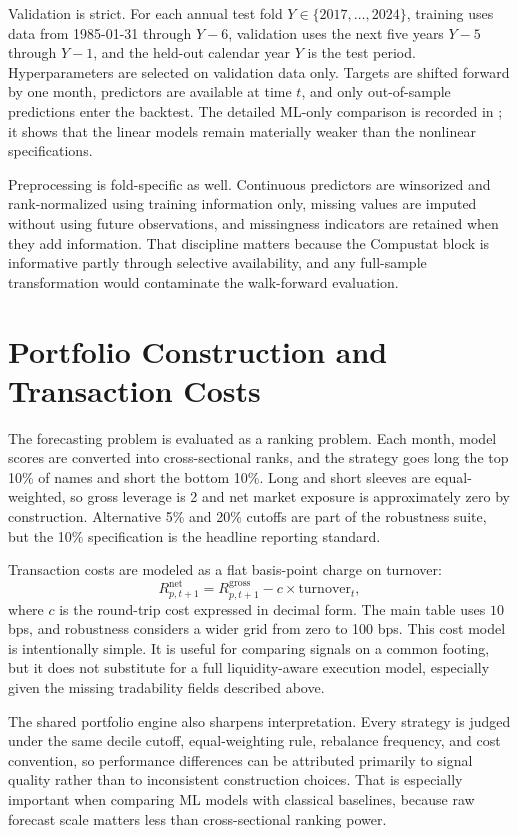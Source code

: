 Validation is strict. For each annual test fold $Y \in \{2017,\ldots,2024\}$,
training uses data from 1985-01-31 through $Y-6$, validation uses the next
five years $Y-5$ through $Y-1$, and the held-out calendar year $Y$ is the
test period. Hyperparameters are selected on validation data only. Targets are
shifted forward by one month, predictors are available at time $t$, and only
out-of-sample predictions enter the backtest. The detailed ML-only
comparison is recorded in ; it
shows that the linear models remain materially weaker than the nonlinear
specifications.

Preprocessing is fold-specific as well. Continuous predictors are winsorized
and rank-normalized using training information only, missing values are
imputed without using future observations, and missingness indicators are
retained when they add information. That discipline matters because the
Compustat block is informative partly through selective availability, and any
full-sample transformation would contaminate the walk-forward evaluation.

\section{Portfolio Construction and Transaction Costs}

The forecasting problem is evaluated as a ranking problem. Each month, model
scores are converted into cross-sectional ranks, and the strategy goes long
the top 10\% of names and short the bottom 10\%. Long and short sleeves are
equal-weighted, so gross leverage is 2 and net market exposure is
approximately zero by construction. Alternative 5\% and 20\% cutoffs are part
of the robustness suite, but the 10\% specification is the headline
reporting standard.

Transaction costs are modeled as a flat basis-point charge on turnover:
\[
R^{\text{net}}_{p,t+1}
=
R^{\text{gross}}_{p,t+1}
- c \times \text{turnover}_{t},
\]
where $c$ is the round-trip cost expressed in decimal form. The main table
uses $10$ bps, and robustness considers a wider grid from zero to 100 bps.
This cost model is intentionally simple. It is useful for comparing signals on
a common footing, but it does not substitute for a full liquidity-aware
execution model, especially given the missing tradability fields described
above.

The shared portfolio engine also sharpens interpretation. Every strategy is
judged under the same decile cutoff, equal-weighting rule, rebalance
frequency, and cost convention, so performance differences can be attributed
primarily to signal quality rather than to inconsistent construction choices.
That is especially important when comparing ML models with classical baselines,
because raw forecast scale matters less than cross-sectional ranking power.

